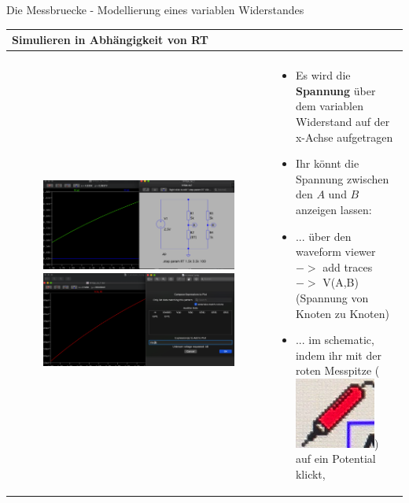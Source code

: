 \begin{frame}[t]{Die Messbruecke - Modellierung eines variablen Widerstandes}
\begin{spacing}{0.9}
\begin{tiny}
\begin{table}[h!]
\begin{tabular}{p{5cm} p{5cm}}
        \textbf{Simulieren in Abhängigkeit von RT} \\
        \hline \\
        \begin{minipage}{0.5\textwidth}
            \begin{figure}
                \centering
                \includegraphics[width=0.9\linewidth]{pictures/rt_analysis_1.png}
                \includegraphics[width=0.9\linewidth]{pictures/rt_analysis_3.png}
            \end{figure}
        \end{minipage} 
        &
        \begin{minipage}{0.5\textwidth}
            \begin{itemize}
                \item Es wird die \textbf{Spannung} über dem variablen Widerstand auf der x-Achse aufgetragen
                \item Ihr könnt die Spannung zwischen den $A$ und $B$ anzeigen lassen:
                \item ... über den waveform viewer $->$ add traces $->$ V(A,B) (Spannung von Knoten zu Knoten)
                \item ... im schematic, indem ihr mit der roten Messpitze (\includegraphics[scale=0.1]{pictures/rot.png}) auf ein Potential klickt,

\end{itemize}
\end{minipage}
\end{tabular}
\end{table}
\end{tiny}
\end{spacing}
\end{frame}
